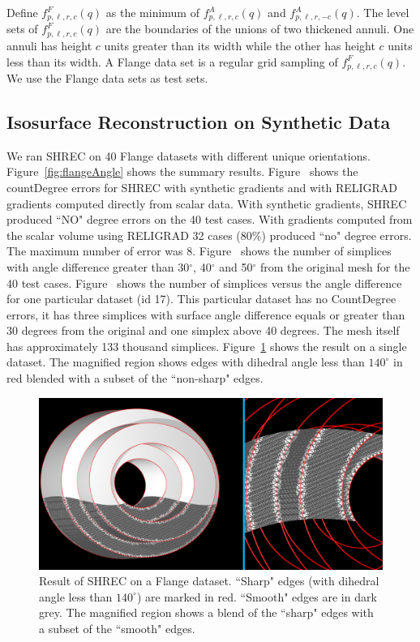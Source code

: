 Define $f^F_{p,\ell,r,c}(q)$ as the minimum
of $f^A_{p,\ell,r,c}(q)$ and $f^A_{p,\ell,r,-c}(q)$.
The level sets of $f^F_{p,\ell,r,c}(q)$ are the boundaries
of the unions of two thickened annuli.
One annuli has height $c$ units greater than its width
while the other has height $c$ units less than its width.
A Flange data set is a regular grid sampling of $f^F_{p,\ell,r,c}(q)$. 
We use the Flange data sets as test sets.

\subsection{Isosurface Reconstruction on Synthetic Data}
We ran SHREC on 40 Flange datasets with different unique orientations. Figure~\ref{fig:flangeAngle} shows the summary results.
Figure~\protect{} shows the countDegree errors for SHREC with synthetic gradients and with RELIGRAD gradients computed directly from scalar data. With synthetic gradients, SHREC produced ``NO" degree errors on the 40 test cases.
With gradients computed from the scalar volume using RELIGRAD 32 cases (80$\%$) produced ``no" degree errors. The maximum number of error was 8.
Figure~\protect{} shows the number of simplices with angle difference greater than 30$^\circ$, 40$^\circ$ and 50$^\circ$ from the original mesh for the 40 test cases. Figure~\protect{} shows  the number of simplices versus the angle difference for one particular dataset (id 17). This particular dataset has no CountDegree errors, it has three simplices with surface angle difference equals or greater than 30 degrees from the original and one simplex above 40 degrees. The mesh itself has approximately 133 thousand simplices. 
Figure~\ref{fig:flange1} shows the result on a single dataset. The magnified region shows edges with dihedral angle less than $140^\circ$ in red blended with a subset of the ``non-sharp" edges. 
\begin{figure}[htb]
\includegraphics[width=\linewidth]{images/shrecFlangeCombine2.eps}
\caption{Result of SHREC on a Flange dataset. ``Sharp" edges (with dihedral angle less than $140^\circ$) are marked in red. 
``Smooth" edges are in dark grey. The magnified region shows a blend of the ``sharp" edges with a subset of the ``smooth" edges.}
\label{fig:flange1}
\end{figure}

